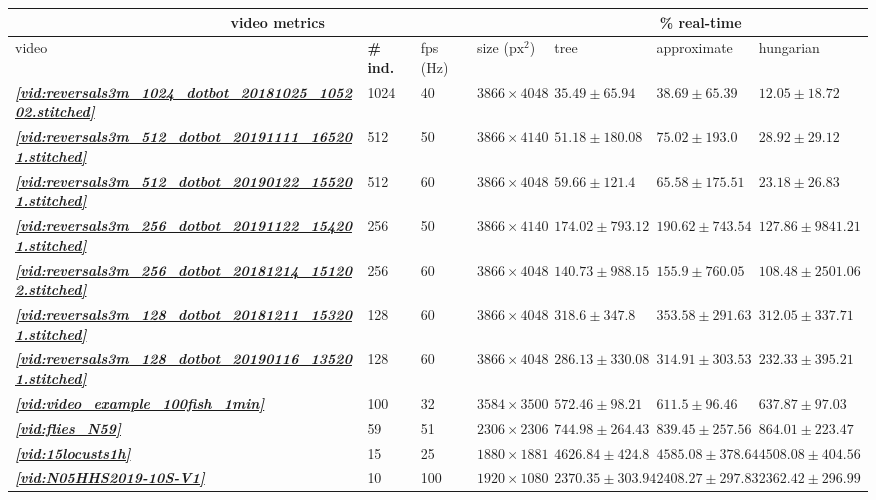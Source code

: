 \documentclass[9pt,lineno]{elife}
\newcommand{\vidref}[1]{\textit{\textbf{\ref{#1}}}}
\begin{document}
\begin{table}[h]
\begin{tabular}{l l l l | l l l l}
\toprule
\multicolumn{4}{c|}{video metrics} & \multicolumn{3}{c}{\% real-time} \\
\midrule
video & \textbf{{\# ind.}}  & fps (Hz) & size ($\mathrm{px}^2$) & tree & approximate & hungarian  \\
\midrule

\vidref{vid:reversals3m_1024_dotbot_20181025_105202.stitched} & 1024 & 40 & $ 3866 \times 4048 $ & $ 35.49 \pm 65.94 $ & $ 38.69 \pm 65.39 $ & $ 12.05 \pm 18.72 $ \\
\vidref{vid:reversals3m_512_dotbot_20191111_165201.stitched} & 512 & 50 & $ 3866 \times 4140 $ & $ 51.18 \pm 180.08 $ & $ 75.02 \pm 193.0 $ & $ 28.92 \pm 29.12 $ \\
\vidref{vid:reversals3m_512_dotbot_20190122_155201.stitched} & 512 & 60 & $ 3866 \times 4048 $ & $ 59.66 \pm 121.4 $ & $ 65.58 \pm 175.51 $ & $ 23.18 \pm 26.83 $ \\
\vidref{vid:reversals3m_256_dotbot_20191122_154201.stitched} & 256 & 50 & $ 3866 \times 4140 $ & $ 174.02 \pm 793.12 $ & $ 190.62 \pm 743.54 $ & $ 127.86 \pm 9841.21 $ \\
\vidref{vid:reversals3m_256_dotbot_20181214_151202.stitched} & 256 & 60 & $ 3866 \times 4048 $ & $ 140.73 \pm 988.15 $ & $ 155.9 \pm 760.05 $ & $ 108.48 \pm 2501.06 $ \\
\vidref{vid:reversals3m_128_dotbot_20181211_153201.stitched} & 128 & 60 & $ 3866 \times 4048 $ & $ 318.6 \pm 347.8 $ & $ 353.58 \pm 291.63 $ & $ 312.05 \pm 337.71 $ \\
\vidref{vid:reversals3m_128_dotbot_20190116_135201.stitched} & 128 & 60 & $ 3866 \times 4048 $ & $ 286.13 \pm 330.08 $ & $ 314.91 \pm 303.53 $ & $ 232.33 \pm 395.21 $ \\
\vidref{vid:video_example_100fish_1min} & 100 & 32 & $ 3584 \times 3500 $ & $ 572.46 \pm 98.21 $ & $ 611.5 \pm 96.46 $ & $ 637.87 \pm 97.03 $ \\
\vidref{vid:flies_N59} & 59 & 51 & $ 2306 \times 2306 $ & $ 744.98 \pm 264.43 $ & $ 839.45 \pm 257.56 $ & $ 864.01 \pm 223.47 $ \\
\vidref{vid:15locusts1h} & 15 & 25 & $ 1880 \times 1881 $ & $ 4626.84 \pm 424.8 $ & $ 4585.08 \pm 378.64 $ & $ 4508.08 \pm 404.56 $ \\
\vidref{vid:N05HHS2019-10S-V1} & 10 & 100 & $ 1920 \times 1080 $ & $ 2370.35 \pm 303.94 $ & $ 2408.27 \pm 297.83 $ & $ 2362.42 \pm 296.99 $ \\

\end{tabular}
\end{table}
\end{document}
